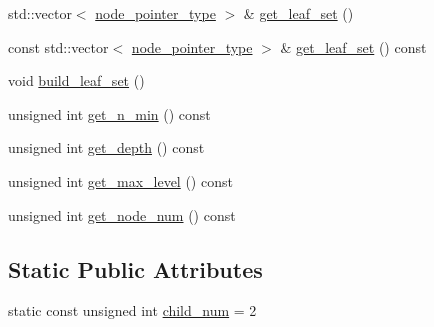 \begin{DoxyCompactItemize}
\item 
std\+::vector$<$ \hyperlink{classClusterTree_ae4bb0fdc7ac559d7844d04a00ab3e9de}{node\+\_\+pointer\+\_\+type} $>$ \& \hyperlink{classClusterTree_af17a96da7f2e5391d3e49028b2aba894}{get\+\_\+leaf\+\_\+set} ()
\item 
const std\+::vector$<$ \hyperlink{classClusterTree_ae4bb0fdc7ac559d7844d04a00ab3e9de}{node\+\_\+pointer\+\_\+type} $>$ \& \hyperlink{classClusterTree_afbf8f03d5f34305d3c34ae4c360f50ae}{get\+\_\+leaf\+\_\+set} () const
\item 
void \hyperlink{classClusterTree_a1e7dc037d01b3e15f1d6b4eacac59cb1}{build\+\_\+leaf\+\_\+set} ()
\item 
unsigned int \hyperlink{classClusterTree_a403e59575a89a3e86e8d7092a8815aa5}{get\+\_\+n\+\_\+min} () const
\item 
unsigned int \hyperlink{classClusterTree_a2bd8dd175c4459338d76a8cb879afccf}{get\+\_\+depth} () const
\item 
unsigned int \hyperlink{classClusterTree_a3c1125039b1915ebad94247d6888df31}{get\+\_\+max\+\_\+level} () const
\item 
unsigned int \hyperlink{classClusterTree_af80051449b7324121fb0a27d5ce7c9a1}{get\+\_\+node\+\_\+num} () const
\end{DoxyCompactItemize}
\subsection*{Static Public Attributes}
\begin{DoxyCompactItemize}
\item 
static const unsigned int \hyperlink{classClusterTree_aa9705d3fecd5b405b804331ea031570c}{child\+\_\+num} = 2
\end{DoxyCompactItemize}
